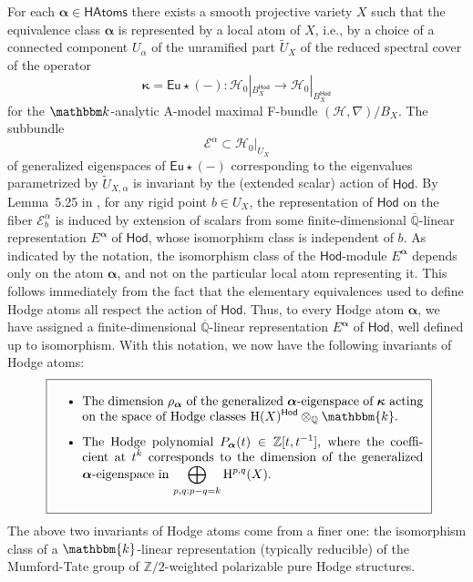 \documentclass[12pt,a4paper]{amsart}
\theoremstyle{definition}
\theoremstyle{remark}
\newcommand{\Z}{\mathbb{Z}}
\begin{document}
For each $\boldsymbol{\alpha} \in \mathsf{HAtoms}$ there exists a smooth projective variety \(X\) such that the equivalence class \(\boldsymbol{\alpha}\) is represented by a local atom of $X$, i.e., by a choice of a connected component \(U_{\alpha}\) of the unramified part \({\widetilde U}_X\) of the reduced spectral cover of the operator
\[
\boldsymbol\kappa = \mathsf{Eu} \star (-) : \mathcal{H}_0|_{{B}^{\mathsf{Hod}}_X} \to \mathcal{H}_0|_{{B}^{\mathsf{Hod}}_X}
\]
for the \(\mathbbm k\)-analytic A-model maximal F-bundle \((\mathcal{H}, \nabla) / {B}_X\). The subbundle 
\[
\mathcal{E}^{\alpha} \subset \mathcal{H}_0|_{U_X}
\]
of generalized eigenspaces of \(\mathsf{Eu} \star (-)\) corresponding to the eigenvalues parametrized by \({\widetilde U}_{X,\alpha}\) is invariant by the (extended scalar) action of $\mathsf{Hod}$. By Lemma~5.25 in \cite{katzarkovpantevyu}, for any rigid point \( b \in U_X \), the representation of \( \mathsf{Hod} \) on the fiber \( \mathcal{E}^{\alpha}_b \) is induced by extension of scalars from some finite-dimensional \( \overline{\mathbb{Q}} \)-linear representation \( E^{\boldsymbol{\alpha}} \) of \( \mathsf{Hod} \), whose isomorphism class is independent of \( b \). As indicated by the notation, the isomorphism class of the \( \mathsf{Hod} \)-module \( E^{\boldsymbol{\alpha}} \) depends only on the atom \( \boldsymbol\alpha \), and not on the particular local atom representing it. This follows immediately from the fact that the elementary equivalences used to define Hodge atoms all respect the action of \( \mathsf{Hod} \). Thus, to every Hodge atom \( \boldsymbol\alpha \), we have assigned a finite-dimensional \( \overline{\mathbb{Q}} \)-linear representation \( E^{\boldsymbol{\alpha}} \) of \( \mathsf{Hod} \), well defined up to isomorphism. With this notation, we now have the following invariants of Hodge atoms:
\begin{equation}
\text{
\fbox{\parbox{0.85\textwidth}{
\begin{itemize}
    \item The dimension \(\rho_{\boldsymbol\alpha}\) of the generalized \(\boldsymbol\alpha\)-eigenspace of \(\boldsymbol{\kappa}\) acting on the space of Hodge classes \(\mathrm{H}(X)^{\mathsf{Hod}} \otimes_{\mathbb{Q}} \mathbbm{k}\).
    \item The Hodge polynomial \(P_{\boldsymbol \alpha}(t) \in \mathbb{Z}[t, t^{-1}]\), where the coefficient at \(t^k\) corresponds to the dimension of the generalized \(\boldsymbol\alpha\)-eigenspace in \(\bigoplus_{p,q:p-q=k} \mathrm{H}^{p,q}(X)\).
\end{itemize}
}
}}\label{invariants-box}
\end{equation}
The above two invariants of Hodge atoms come from a finer one: the isomorphism class of a  $\mathbbm{k}$-linear representation (typically reducible)
of the Mumford-Tate group of  $\Z/2$-weighted  polarizable pure Hodge structures.
\end{document}
